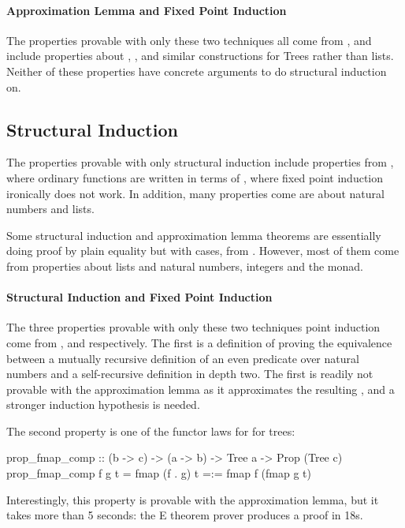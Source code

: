 \paragraph{Approximation Lemma and Fixed Point Induction}
The properties provable with only these two techniques all come from
, and include properties about , ,
 and similar constructions for Trees rather than
lists. Neither of these properties have concrete arguments to do
structural induction on.

\subsection{Structural Induction}
\label{sec:strindres}

The properties provable with only structural induction include
properties from , where ordinary functions are written in
terms of , where fixed point induction ironically does not
work. In addition, many properties come are about natural numbers and
lists.

Some structural induction and approximation lemma theorems are
essentially doing proof by plain equality but with cases, from
. However, most of them come from properties about lists and
natural numbers, integers and the  monad.

\paragraph{Structural Induction and Fixed Point Induction}
The three properties provable with only these two techniques point
induction come from ,  and 
respectively. The first is a definition of proving the equivalence
between a mutually recursive definition of an even predicate over
natural numbers and a self-recursive definition in depth two. The
first is readily not provable with the approximation lemma as it
approximates the resulting , and a stronger induction
hypothesis is needed.

The second property is one of the functor laws for  for trees:

\begin{code}
prop_fmap_comp :: (b -> c) -> (a -> b) -> Tree a -> Prop (Tree c)
prop_fmap_comp f g t = fmap (f . g) t =:= fmap f (fmap g t)
\end{code}

\noident
Interestingly, this property is provable with the approximation lemma,
but it takes more than 5 seconds: the E theorem prover produces a
proof in 18s.

